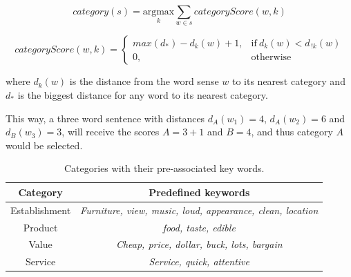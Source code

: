 \documentclass[a4paper,11pt]{kth-mag}
\begin{document}
\begin{equation} \label{eq:heruistic}
  category(s) =
  \underset{k}{\text{argmax}}
  \sum_{w \in s} categoryScore(w, k)
\end{equation}

\begin{equation} \label{eq:heruistic_d}
  categoryScore(w, k) =
  \begin{cases}
    max(d_*) - d_k(w) + 1, & \text{if}\ d_k(w) < d_{\,!k}(w)\\
    0, & \text{otherwise}
  \end{cases}
\end{equation}

where $d_k(w)$ is the distance from the word sense $w$ to its nearest category and $d_*$ is the biggest distance for any word to its nearest category.

This way, a three word sentence with distances $d_A(w_1)=4$, $d_A(w_2)=6$ and $d_B(w_3)=3$, will receive the scores $A=3+1$ and $B=4$, and thus category $A$ would be selected.


\begin{table}[t]
  \centering
  \begin{tabular}{| c | c |}
    \hline
    \textbf{Category} & \textbf{Predefined keywords}\\ \hline
    Establishment & \emph{Furniture, view, music, loud, appearance, clean, location}\\ \hline
    Product & \emph{food, taste, edible}\\ \hline
    Value & \emph{Cheap, price, dollar, buck, lots, bargain}\\ \hline
    Service & \emph{Service, quick, attentive}\\ \hline
  \end{tabular}
  \caption{Categories with their pre-associated key words.}
  \label{cat_words}
\end{table}
\end{document}
